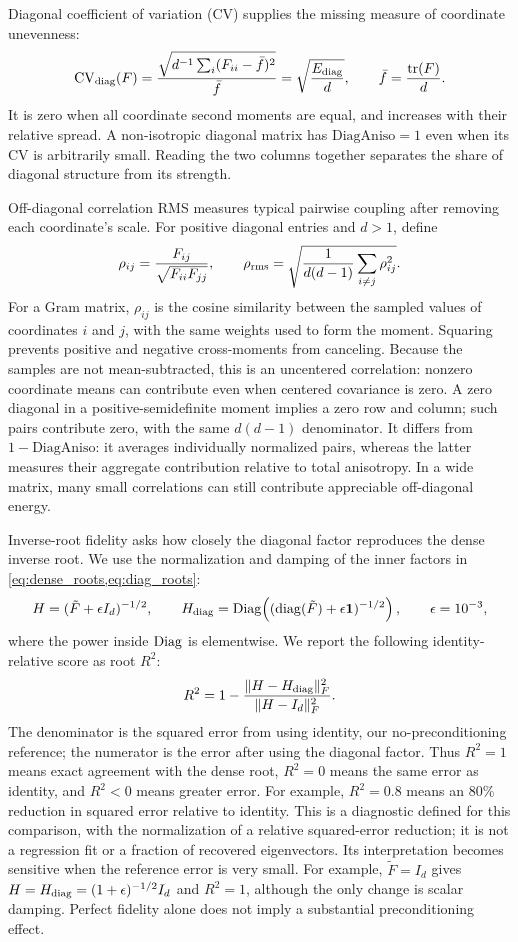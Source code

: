 Diagonal coefficient of variation (CV) supplies the missing measure of coordinate unevenness:
\[
 \mathrm{CV}_{\rm diag}(F)
 =\frac{\sqrt{d^{-1}\sum_i(F_{ii}-\bar f)^2}}{\bar f}
 =\sqrt{\frac{E_{\rm diag}}{d}},
 \qquad \bar f=\frac{\operatorname{tr}(F)}{d}.
\]
It is zero when all coordinate second moments are equal, and increases with their relative spread. A non-isotropic diagonal matrix has $\mathrm{DiagAniso}=1$ even when its CV is arbitrarily small. Reading the two columns together separates the share of diagonal structure from its strength.

Off-diagonal correlation RMS measures typical pairwise coupling after removing each coordinate's scale. For positive diagonal entries and $d>1$, define
\[
 \rho_{ij}=\frac{F_{ij}}{\sqrt{F_{ii}F_{jj}}},\qquad
 \rho_{\rm rms}=\sqrt{\frac{1}{d(d-1)}\sum_{i\ne j}\rho_{ij}^2}.
\]
For a Gram matrix, $\rho_{ij}$ is the cosine similarity between the sampled values of coordinates $i$ and $j$, with the same weights used to form the moment. Squaring prevents positive and negative cross-moments from canceling. Because the samples are not mean-subtracted, this is an uncentered correlation: nonzero coordinate means can contribute even when centered covariance is zero. A zero diagonal in a positive-semidefinite moment implies a zero row and column; such pairs contribute zero, with the same $d(d-1)$ denominator. It differs from $1-\mathrm{DiagAniso}$: it averages individually normalized pairs, whereas the latter measures their aggregate contribution relative to total anisotropy. In a wide matrix, many small correlations can still contribute appreciable off-diagonal energy.

Inverse-root fidelity asks how closely the diagonal factor reproduces the dense inverse root. We use the normalization and damping of the inner factors in \cref{eq:dense_roots,eq:diag_roots}:
\[
 H=(\tilde F+\epsilon I_d)^{-1/2},\qquad
 H_{\rm diag}=\operatorname{Diag}\!\left((\operatorname{diag}(\tilde F)+\epsilon\mathbf1)^{-1/2}\right),
 \qquad\epsilon=10^{-3},
\]
where the power inside $\operatorname{Diag}$ is elementwise. We report the following identity-relative score as root $R^2$:
\begin{equation}
 R^2=1-\frac{\|H-H_{\rm diag}\|_F^2}{\|H-I_d\|_F^2}.
 \label{eq:r2_root}
\end{equation}
The denominator is the squared error from using identity, our no-preconditioning reference; the numerator is the error after using the diagonal factor. Thus $R^2=1$ means exact agreement with the dense root, $R^2=0$ means the same error as identity, and $R^2<0$ means greater error. For example, $R^2=0.8$ means an 80\% reduction in squared error relative to identity. This is a diagnostic defined for this comparison, with the normalization of a relative squared-error reduction; it is not a regression fit or a fraction of recovered eigenvectors. Its interpretation becomes sensitive when the reference error is very small. For example, $\tilde F=I_d$ gives $H=H_{\rm diag}=(1+\epsilon)^{-1/2}I_d$ and $R^2=1$, although the only change is scalar damping. Perfect fidelity alone does not imply a substantial preconditioning effect.


